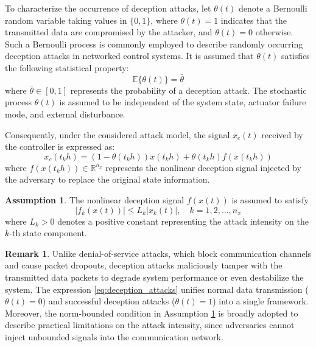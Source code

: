 \documentclass[preprint,review,fleqn,sort&compress,3p]{elsarticle}
\theoremstyle{definition} %
\theoremstyle{definition}%
\newtheorem{rem}{Remark}[section]
\newtheorem{asptn}{Assumption}[section]
\begin{document}
To characterize the occurrence of deception attacks, let $\theta(t)$ denote a Bernoulli random variable taking values in $\{0,1\}$, where $\theta(t)=1$ indicates that the transmitted data are compromised by the attacker, and $\theta(t) = 0$ otherwise. Such a Bernoulli process is commonly employed to describe randomly occurring deception attacks in networked control systems. It is assumed that $\theta(t)$ satisfies the following statistical property:
\begin{equation}
	\mathbb{E}\{\theta(t)\} = \bar{\theta} 
\end{equation}
where $\bar{\theta} \in [0,1]$ represents the probability of a deception attack.
The stochastic process $\theta(t)$ is assumed to be independent of the system state, actuator failure mode, and external disturbance.

Consequently, under the considered attack model, the signal $x_c(t)$ received by the controller is expressed as:
\begin{equation}\label{eq:deception_attacks}
	x_c(t_{k} h) = (1 - \theta(t_{k} h)) x(t_{k} h) + \theta(t_{k} h) f(x(t_{k} h))
\end{equation}
where $f(x(t_{k}h)) \in \mathbb{R}^{n_x}$ represents the nonlinear deception signal injected by the adversary to replace the original state information.

\begin{asptn} \label{assump:attack_bound}
The nonlinear deception signal $f(x(t))$ is assumed to satisfy
\begin{equation}
	|f_k(x(t))| \le L_k |x_k(t)|,\quad k = 1,2,\ldots,n_x
\end{equation}
where $L_k > 0$ denotes a positive constant representing the attack intensity on the $k$-th state component.
\end{asptn}
\begin{rem}
	Unlike denial-of-service attacks, which block communication channels
	and cause packet dropouts, deception attacks maliciously tamper with the transmitted data packets to
	degrade system performance or even destabilize the system. The expression \eqref{eq:deception_attacks} unifies normal data transmission ($\theta(t) = 0$) and successful deception attacks ($\theta(t) = 1$) into
	a single framework. Moreover, the norm-bounded condition in Assumption \ref{assump:attack_bound} is broadly adopted to
	describe practical limitations on the attack intensity, since adversaries cannot inject unbounded signals
	into the communication network.
\end{rem}
\end{document}
